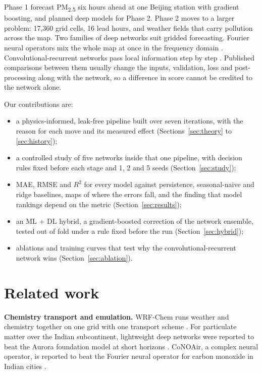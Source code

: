 \documentclass[conference]{IEEEtran}
\newcommand{\PM}{PM\textsubscript{2.5}}
\begin{document}
Phase 1 \cite{phase1} forecast \PM{} six hours ahead at one Beijing station with gradient boosting, and planned deep models for Phase 2. Phase 2 moves to a larger problem: 17{,}360 grid cells, 16 lead hours, and weather fields that carry pollution across the map. Two families of deep networks suit gridded forecasting. Fourier neural operators mix the whole map at once in the frequency domain \cite{li2021fno,guibas2022afno}. Convolutional-recurrent networks pass local information step by step \cite{shi2015convlstm,ballas2016convgru}. Published comparisons between them usually change the inputs, validation, loss and post-processing along with the network, so a difference in score cannot be credited to the network alone.

Our contributions are:
\begin{itemize}
\item a physics-informed, leak-free pipeline built over seven iterations, with the reason for each move and its measured effect (Sections~\ref{sec:theory} to \ref{sec:history});
\item a controlled study of five networks inside that one pipeline, with decision rules fixed before each stage and 1, 2 and 5 seeds (Section~\ref{sec:study});
\item MAE, RMSE and $R^2$ for every model against persistence, seasonal-naive and ridge baselines, maps of where the errors fall, and the finding that model rankings depend on the metric (Section~\ref{sec:results});
\item an ML + DL hybrid, a gradient-boosted correction of the network ensemble, tested out of fold under a rule fixed before the run (Section~\ref{sec:hybrid});
\item ablations and training curves that test why the convolutional-recurrent network wins (Section~\ref{sec:ablation}).
\end{itemize}

\section{Related work}
\label{sec:related}
\textbf{Chemistry transport and emulation.} WRF-Chem runs weather and chemistry together on one grid with one transport scheme \cite{grell2005}. For particulate matter over the Indian subcontinent, lightweight deep networks were reported to beat the Aurora foundation model at short horizons \cite{kushwaha2025}. CoNOAir, a complex neural operator, is reported to beat the Fourier neural operator for carbon monoxide in Indian cities \cite{bedi2025conoair}.
\end{document}
